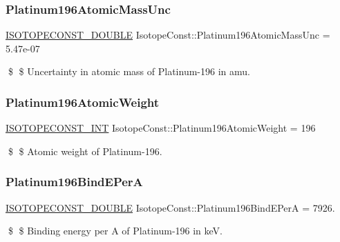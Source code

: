 \subsubsection{\texorpdfstring{Platinum196\+Atomic\+Mass\+Unc}{Platinum196AtomicMassUnc}}
{\footnotesize\ttfamily \mbox{\hyperlink{group___isotope_const-_macros_ga8f45a7272ce02c0b4c65c44636ed719a}{I\+S\+O\+T\+O\+P\+E\+C\+O\+N\+S\+T\+\_\+\+D\+O\+U\+B\+LE}} Isotope\+Const\+::\+Platinum196\+Atomic\+Mass\+Unc = 5.\+47e-\/07}

\$ \$ Uncertainty in atomic mass of Platinum-\/196 in amu. \mbox{\label{group___isotope_const-_platinum-_pt196_gaa8961487b6ac7b7be5112c6539f10580}} 
\subsubsection{\texorpdfstring{Platinum196\+Atomic\+Weight}{Platinum196AtomicWeight}}
{\footnotesize\ttfamily \mbox{\hyperlink{group___isotope_const-_macros_ga5f18360b3e99483a35c32d789e62621c}{I\+S\+O\+T\+O\+P\+E\+C\+O\+N\+S\+T\+\_\+\+I\+NT}} Isotope\+Const\+::\+Platinum196\+Atomic\+Weight = 196}

\$ \$ Atomic weight of Platinum-\/196. \mbox{\label{group___isotope_const-_platinum-_pt196_gadccc4565347e69bfc4284f4a30decee7}} 
\subsubsection{\texorpdfstring{Platinum196\+Bind\+E\+PerA}{Platinum196BindEPerA}}
{\footnotesize\ttfamily \mbox{\hyperlink{group___isotope_const-_macros_ga8f45a7272ce02c0b4c65c44636ed719a}{I\+S\+O\+T\+O\+P\+E\+C\+O\+N\+S\+T\+\_\+\+D\+O\+U\+B\+LE}} Isotope\+Const\+::\+Platinum196\+Bind\+E\+PerA = 7926.}

\$ \$ Binding energy per A of Platinum-\/196 in keV. \mbox{\label{group___isotope_const-_platinum-_pt196_ga335e4f4031d05bb402f90b797b891b2c}} 
